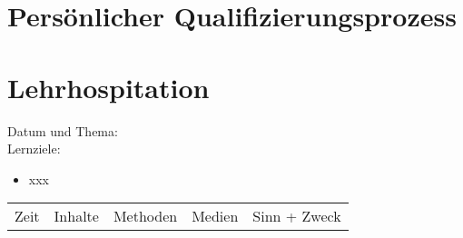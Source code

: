 \documentclass[%
fontsize=12pt,
paper=a4,
oneside,
DIV=11,
BCOR=0cm,
pagesize=automedia,
parskip=false,
headings=normal,
titlepage=true%
]{scrartcl}
\begin{document}
\section{Pers\"{o}nlicher Qualifizierungsprozess}

\section{Lehrhospitation}
\clearpage
Datum und Thema:\\
Lernziele:
\begin{itemize}
\item xxx
\end{itemize}

\begin{longtable}{c|c|c|c|c}
Zeit & Inhalte & Methoden & Medien & Sinn + Zweck
\hline
\end{longtable}
\end{document}
